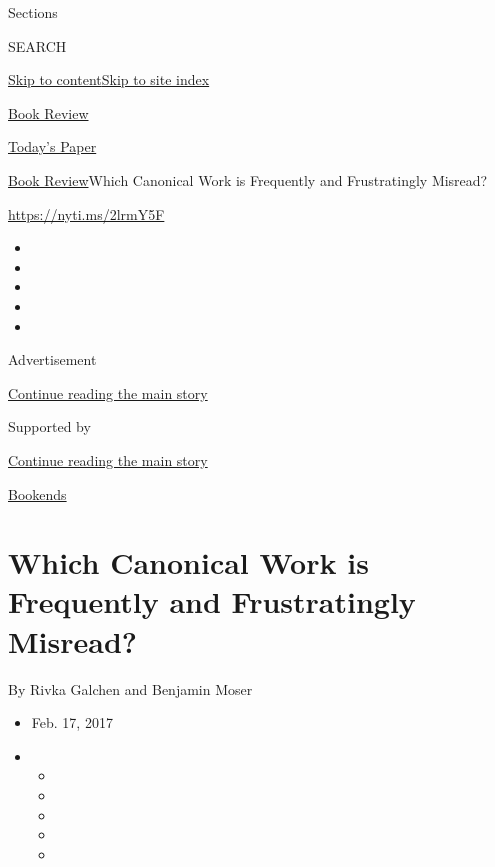 Sections

SEARCH

\protect\hyperlink{site-content}{Skip to
content}\protect\hyperlink{site-index}{Skip to site index}

\href{https://www.nytimes3xbfgragh.onion/section/books/review}{Book
Review}

\href{https://myaccount.nytimes3xbfgragh.onion/auth/login?response_type=cookie\&client_id=vi}{}

\href{https://www.nytimes3xbfgragh.onion/section/todayspaper}{Today's
Paper}

\href{/section/books/review}{Book Review}\textbar{}Which Canonical Work
is Frequently and Frustratingly Misread?

\url{https://nyti.ms/2lrmY5F}

\begin{itemize}
\item
\item
\item
\item
\item
\end{itemize}

Advertisement

\protect\hyperlink{after-top}{Continue reading the main story}

Supported by

\protect\hyperlink{after-sponsor}{Continue reading the main story}

\href{/column/bookends}{Bookends}

\hypertarget{which-canonical-work-is-frequently-and-frustratingly-misread}{%
\section{Which Canonical Work is Frequently and Frustratingly
Misread?}\label{which-canonical-work-is-frequently-and-frustratingly-misread}}

By Rivka Galchen and Benjamin Moser

\begin{itemize}
\item
  Feb. 17, 2017
\item
  \begin{itemize}
  \item
  \item
  \item
  \item
  \item
  \end{itemize}
\end{itemize}

